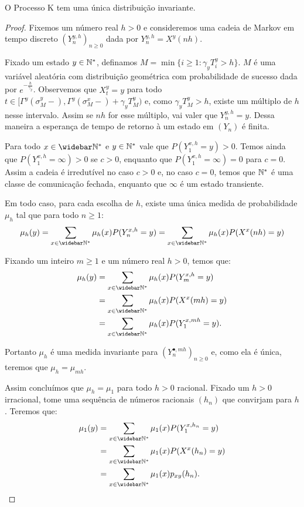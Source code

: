 \begin{proposicao}
  \label{prop:existe-unica-invariante}
  O Processo K tem uma única distribuição invariante.
\end{proposicao}
\begin{proof}
  Fixemos um número real $h > 0$ e consideremos uma cadeia de Markov em
  tempo discreto $(Y^{y, h}_n)_{n \geq 0}$ dada por $Y^{y, h}_n =
  X^y(n h)$.

  Fixado um estado $y \in {\mathbb{N^*}}$, definamos $M = \min \{ i \geq 1:
  \gamma_y T_i^y > h \}$. $M$ é uma variável aleatória com
  distribuição geométrica com probabilidade de sucesso dada por
  $e^{-\frac{h}{\gamma_y}}$. Observemos que $X_t^y = y$ para todo $t
  \in [\Gamma^y(\sigma_M^y-), \Gamma^y(\sigma_M^x-) + \gamma_y T_M^y)$
  e, como $\gamma_y T_M^y > h$, existe um múltiplo de $h$ nesse
  intervalo. Assim se $n h$ for esse múltiplo, vai valer que $Y_n^{y,
    h} = y$. Dessa maneira a esperança de tempo de retorno à um estado
  em $(Y_n)$ é finita.

  Para todo $x \in \Nzb$ e $y \in {\mathbb{N^*}}$ vale que $P (Y^{x, h}_1 = y) >
  0$.  Temos ainda que $P (Y^{x, h}_1 = \infty ) > 0$ se $c > 0$,
  enquanto que $P (Y^{x, h}_1 = \infty) = 0$ para $c = 0$. Assim a
  cadeia é irredutível no caso $c > 0$ e, no caso $c = 0$, temos que
  ${\mathbb{N^*}}$ é uma classe de comunicação fechada, enquanto que $\infty$ é
  um estado transiente.


  Em todo caso, para cada escolha de $h$, existe uma única medida de
  probabilidade $\mu_h$ tal que para todo $n \geq 1$:
  \begin{displaymath}
    \mu_h (y) = \sum_{x \in \Nzb} \mu_h(x) P ( Y_n^ {x, h} = y) =
    \sum_{x \in \Nzb} \mu_h(x) P ( X^x (nh) = y)
  \end{displaymath}

  Fixando um inteiro $m \geq 1$ e um número real $h > 0$, temos que:
  \begin{align*}
    \mu_h (y) &= \sum_{x \in \Nzb} \mu_h(x) P ( Y_{m}^ {x, h} = y)\\
    &= \sum_{x \in \Nzb} \mu_h(x) P ( X^x (m h) = y) \\
    &= \sum_{x \in \Nzb} \mu_h(x) P ( Y_{1}^ {x, m h} = y).
  \end{align*}

  Portanto $\mu_h$ é uma medida invariante para $(Y^{\bullet, mh}_n)_{n
    \geq 0}$ e, como ela é única, teremos que $\mu_h = \mu_{m h}$.

  Assim concluímos que $\mu_{h} = \mu_1$ para todo $h > 0$ racional.
  Fixado um $h > 0$ irracional, tome uma sequência de números
  racionais $(h_n)$ que convirjam para $h$. Teremos que:
  \begin{align*}
    \mu_1(y) &= \sum_{x \in \Nzb} \mu_1(x) P ( Y_{1}^ {x, h_n} = y)\\
    &= \sum_{x \in \Nzb} \mu_1(x) P ( X^x(h_n) = y)\\
    &= \sum_{x \in \Nzb} \mu_1(x) p_{x y} (h_n).    
  \end{align*}
  

\end{proof}
